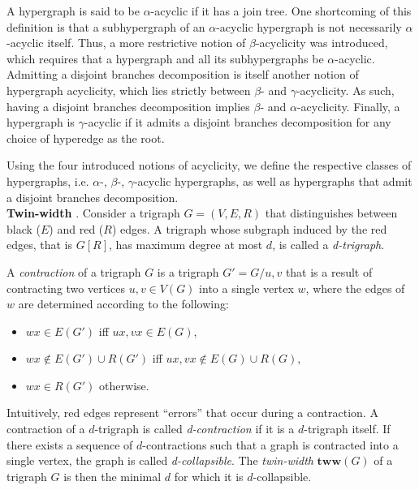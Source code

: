 A hypergraph is said to be $\alpha$-acyclic if it has a join tree.
One shortcoming of this definition is that a subhypergraph of an $\alpha$-acyclic hypergraph is not necessarily $\alpha$-acyclic itself.
Thus, a more restrictive notion of $\beta$-acyclicity was introduced, which requires that a hypergraph and all its subhypergraphs be $\alpha$-acyclic.
Admitting a disjoint branches decomposition is itself another notion of hypergraph acyclicity, which lies strictly between $\beta$- and $\gamma$-acyclicity.
As such, having a disjoint branches decomposition implies $\beta$- and $\alpha$-acyclicity.
Finally, a hypergraph is $\gamma$-acyclic if it admits a disjoint branches decomposition for any choice of hyperedge as the root.

Using the four introduced notions of acyclicity, we define the respective classes of hypergraphs, i.e. $\alpha$-, $\beta$-, $\gamma$-acyclic hypergraphs, as well as hypergraphs that admit a disjoint branches decomposition. \\

\noindent
\textbf{Twin-width} \cite{DBLP:conf/sat/GanianPSSS22}.
Consider a trigraph $G=(V,E,R)$ that distinguishes between black ($E$) and red ($R$) edges.
A trigraph whose subgraph induced by the red edges, that is $G[R]$, has maximum degree at most $d$, is called a {\em d-trigraph}.

A {\em contraction} of a trigraph $G$ is a trigraph $G'=G/u,v$ that is a result of contracting two vertices $u,v \in V(G)$ into a single vertex $w$, where the edges of $w$ are determined according to the following:
\begin{itemize}[--]
	\item $wx \in E(G')$ iff $ux, vx \in E(G)$,
	\item $wx \not\in E(G') \cup R(G')$ iff $ux, vx \not\in E(G)\cup R(G),$
	\item $wx \in R(G')$ otherwise.
\end{itemize}
Intuitively, red edges represent ``errors'' that occur during a contraction.
A contraction of a $d$-trigraph is called {\em d-contraction} if it is a $d$-trigraph itself.
If there exists a sequence of $d$-contractions such that a graph is contracted into a single vertex, the graph is called {\em d-collapsible}.
The {\em twin-width} $\textbf{tww}(G)$ of a trigraph $G$ is then the minimal $d$ for which it is $d$-collapsible. \\

%
%

